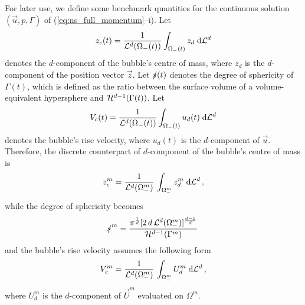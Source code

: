 For later use, we define some benchmark quantities for the continuous
solution $(\vec u, p, \Gamma)$ of (\ref{eq:ns_full_momentum}--i). Let
\begin{equation}
z_c(t) = \frac{1}{\mathcal{L}^d(\Omega_-(t))}\int_{\Omega_-(t)} z_d \;{\rm d}{\cal L}^{d}
\end{equation}
denotes the $d$-component of the bubble's centre of mass, where $z_d$ is the
$d$-component of the position vector $\vec z$. Let $\mbox{$s\!\!\!\!\:/$}(t)$ denotes the
degree of sphericity of $\Gamma(t)$, which is defined as the ratio between the
surface volume of a volume-equivalent hypersphere and $\mathcal{H}^{d-1}(\Gamma(t))$. Let
\begin{equation}
V_c(t) = \frac{1}{\mathcal{L}^d(\Omega_-(t))}\int_{\Omega_-(t)} u_d(t) \;{\rm d}{\cal L}^{d}
\end{equation}
denotes the bubble's rise velocity, where $u_d(t)$ is the $d$-component of
$\vec u$. Therefore, the discrete counterpart of $d$-component of the bubble's
centre of mass is
\begin{equation}
z_c^m = \frac{1}{\mathcal{L}^d(\Omega_-^m)}\,\int_{\Omega_-^m} z_d^{m} \;{\rm d}{\cal L}^{d}\,,
\end{equation}
while the degree of sphericity becomes
\begin{equation}
\mbox{$s\!\!\!\!\:/$}^m =\frac{\pi^{\frac{1}{d}}[2\,d\,\mathcal{L}^d(\Omega_-^m)]^\frac{d-1}{d}}
{\mathcal{H}^{d-1}(\Gamma^m)}\,
\end{equation}
and the bubble's rise velocity assumes the following form
\begin{equation}
V^m_c = \frac{1}{\mathcal{L}^d(\Omega_-^m)}\,\int_{\Omega_-^m}U^m_d\;{\rm d}{\cal L}^{d}\,,
\end{equation}
where $U^m_d$ is the $d$-component of $\vec U^m$ evaluated on $\Omega^m$.

